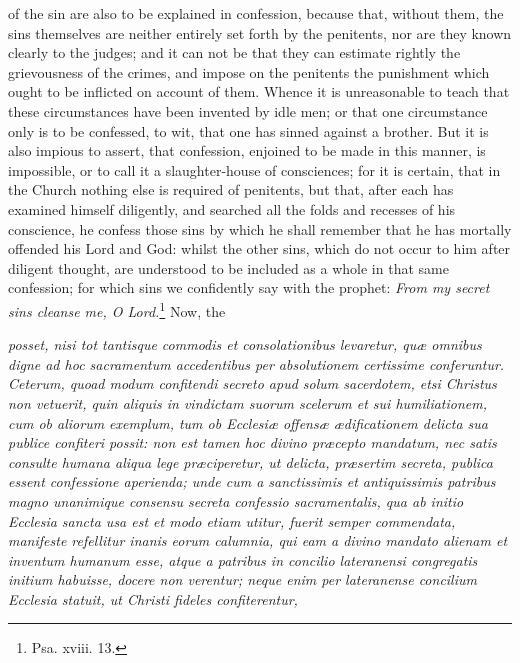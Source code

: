 of the sin are also to be explained in confession, because that, without them, the sins themselves are neither entirely set forth by the penitents, nor are they known clearly to the judges; and it can not be that they can estimate rightly the grievousness of the crimes, and impose on the penitents the punishment which ought to be inflicted on account of them. Whence it is unreasonable to teach that these circumstances have been invented by idle men; or that one circumstance only is to be confessed, to wit, that one has sinned against a brother. But it is also impious to assert, that confession, enjoined to be made in this manner, is impossible, or to call it a slaughter-house of consciences; for it is certain, that in the Church nothing else is required of penitents, but that, after each has examined himself diligently, and searched all the folds and recesses of his conscience, he confess those sins by which he shall remember that he has mortally offended his Lord and God: whilst the other sins, which do not occur to him after diligent thought, are understood to be included as a whole in that same confession; for which sins we confidently say with the prophet: \emph{From my secret sins cleanse me, O Lord.}\footnote{\par   Psa. xviii. 13.} Now, the

\emph{posset, nisi tot tantisque commodis et consolationibus levaretur, quæ omnibus digne ad hoc sacramentum accedentibus per absolutionem certissime conferuntur. Ceterum, quoad modum confitendi secreto apud solum sacerdotem, etsi Christus non vetuerit, quin aliquis in vindictam suorum scelerum et sui humiliationem, cum ob aliorum exemplum, tum ob Ecclesiæ offensæ ædificationem delicta sua publice confiteri possit: non est tamen hoc divino præcepto mandatum, nec satis consulte humana aliqua lege præciperetur, ut delicta, præsertim secreta, publica essent confessione aperienda; unde cum a sanctissimis et antiquissimis patribus magno unanimique consensu secreta confessio sacramentalis, qua ab initio Ecclesia sancta usa est et modo etiam utitur, fuerit semper commendata, manifeste refellitur inanis eorum calumnia, qui eam a divino mandato alienam et inventum humanum esse, atque a patribus in concilio lateranensi congregatis initium habuisse, docere non verentur; neque enim per lateranense concilium Ecclesia statuit, ut Christi fideles confiterentur, }

